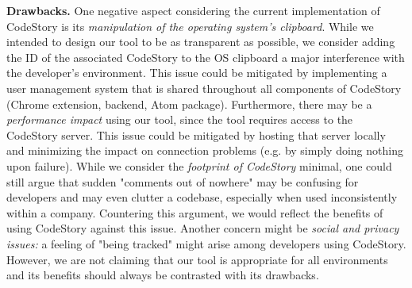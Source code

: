 \documentclass[../manifest.tex]{subfiles}
\begin{document}
\textbf{Drawbacks.}
One negative aspect considering the current implementation of CodeStory is its \textit{manipulation of the operating system's clipboard}. While we intended to design our tool to be as transparent as possible, we consider adding the ID of the associated CodeStory to the OS clipboard a major interference with the developer's environment. This issue could be mitigated by implementing a user management system that is shared throughout all components of CodeStory (Chrome extension, backend, Atom package). Furthermore, there may be a \textit{performance impact} using our tool, since the tool requires access to the CodeStory server. This issue could be mitigated by hosting that server locally and minimizing the impact on connection problems (e.g. by simply doing nothing upon failure). While we consider the \textit{footprint of CodeStory} minimal, one could still argue that sudden "comments out of nowhere" may be confusing for developers and may even clutter a codebase, especially when used inconsistently within a company. Countering this argument, we would reflect the benefits of using CodeStory against this issue. Another concern might be \textit{social and privacy issues:} a feeling of "being tracked" might arise among developers using CodeStory. However, we are not claiming that our tool is appropriate for all environments and its benefits should always be contrasted with its drawbacks.











\end{document}
